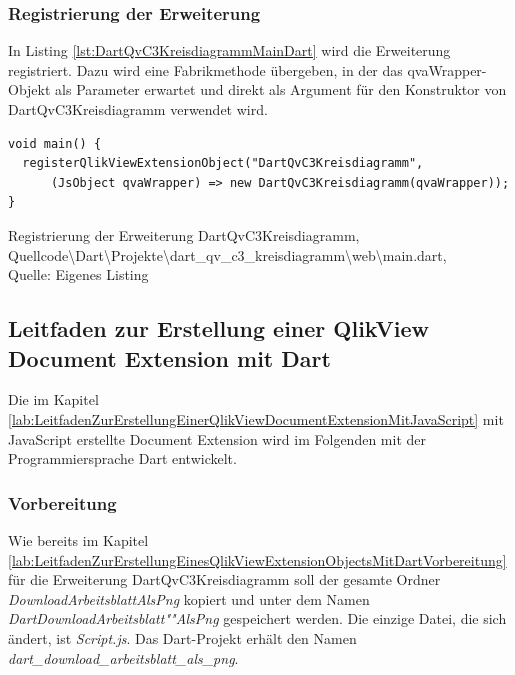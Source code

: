 \subsubsection{Registrierung der Erweiterung}

In Listing \ref {lst:DartQvC3KreisdiagrammMainDart} wird die Erweiterung registriert. Dazu wird eine Fabrikmethode übergeben, in der das qvaWrapper-Objekt als Parameter erwartet und direkt als Argument für den Konstruktor von DartQvC3Kreisdiagramm verwendet wird.


\begin{listing}[htbp]
\begin{verbatim}
void main() {  
  registerQlikViewExtensionObject("DartQvC3Kreisdiagramm", 
      (JsObject qvaWrapper) => new DartQvC3Kreisdiagramm(qvaWrapper));
}
\end{verbatim}
\caption[Registrierung der Erweiterung DartQvC3Kreisdiagramm]{Registrierung der Erweiterung DartQvC3Kreisdiagramm, \\Quellcode\textbackslash{}Dart\textbackslash{}Projekte\textbackslash{}dart\_qv\_c3\_kreisdiagramm\textbackslash{}web\textbackslash{}main.dart, \\Quelle: Eigenes Listing}
\label{lst:DartQvC3KreisdiagrammMainDart}
\end{listing}

\newpage
\subsection{Leitfaden zur Erstellung einer QlikView Document Extension mit Dart}


Die im Kapitel \ref{lab:LeitfadenZurErstellungEinerQlikViewDocumentExtensionMitJavaScript} mit JavaScript erstellte Document Extension wird im Folgenden mit der Programmiersprache Dart entwickelt.

\subsubsection{Vorbereitung}

Wie bereits im Kapitel \ref{lab:LeitfadenZurErstellungEinesQlikViewExtensionObjectsMitDartVorbereitung} für die Erweiterung DartQvC3Kreisdiagramm soll der gesamte Ordner \textit{DownloadArbeitsblattAlsPng} kopiert und unter dem Namen \textit{DartDownloadArbeitsblatt""AlsPng} gespeichert werden. Die einzige Datei, die sich ändert, ist \textit{Script.js}. Das Dart-Projekt erhält den Namen \textit{dart\_download\_arbeitsblatt\_als\_png}.

